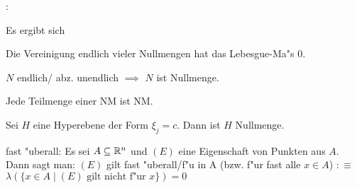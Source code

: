 \remark:{
  Es ergibt sich
  \begin{stmts}
    \item Die Vereinigung endlich vieler Nullmengen hat das Lebesgue-Ma"s $0$.
    \item $N$ endlich/ abz. unendlich $\implies$ $N$ ist Nullmenge.
    \item Jede Teilmenge einer NM ist NM.
    \item Sei $H$ eine Hyperebene der Form $\xi_j=c$. Dann ist $H$ Nullmenge.
    \end{stmts}
  }
 fast "uberall:{
  Es sei $A\subseteq\mathbb R^n$ und $(E)$ eine Eigenschaft von Punkten aus $A$.
  Dann sagt man: $(E)$ gilt fast "uberall/f"u in A (bzw. f"ur fast alle 
  $x\in A$) $:\equiv$ 
  $\lambda(\{x\in A\mid \text{$(E)$ gilt nicht f"ur $x$} \})=0$
  }
